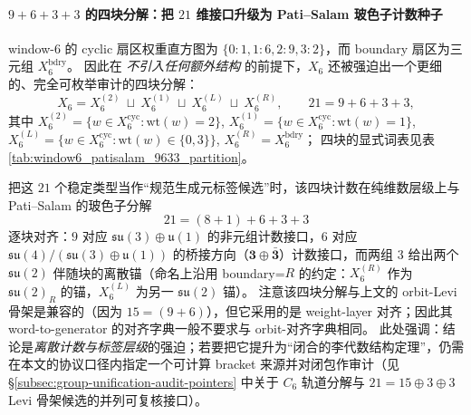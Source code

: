 \paragraph{\texorpdfstring{$9+6+3+3$}{9+6+3+3} 的四块分解：把 \texorpdfstring{$21$}{21} 维接口升级为 Pati--Salam 玻色子计数种子}
window-6 的 cyclic 扇区权重直方图为 \(\{0:1,1:6,2:9,3:2\}\)，而 boundary 扇区为三元组 \(X_6^{\mathrm{bdry}}\)。
因此在 \emph{不引入任何额外结构} 的前提下，\(X_6\) 还被强迫出一个更细的、完全可枚举审计的四块分解：
\[
X_6
=X^{(2)}_6\ \sqcup\ X^{(1)}_6\ \sqcup\ X^{(L)}_6\ \sqcup\ X^{(R)}_6,
\qquad
21=9+6+3+3,
\]
其中
\(
X^{(2)}_6=\{w\in X_6^{\mathrm{cyc}}:\mathrm{wt}(w)=2\}
\),
\(
X^{(1)}_6=\{w\in X_6^{\mathrm{cyc}}:\mathrm{wt}(w)=1\}
\),
\(
X^{(L)}_6=\{w\in X_6^{\mathrm{cyc}}:\mathrm{wt}(w)\in\{0,3\}\}
\),
\(
X^{(R)}_6=X_6^{\mathrm{bdry}}
\)；
四块的显式词表见表 \ref{tab:window6_patisalam_9633_partition}。

\par
把这 \(21\) 个稳定类型当作“规范生成元标签候选”时，该四块计数在纯维数层级上与 Pati--Salam 的玻色子分解
\[
21=(8+1)+6+3+3
\]
逐块对齐：\(9\) 对应 \(\mathfrak{su}(3)\oplus\mathfrak{u}(1)\) 的非元组计数接口，\(6\) 对应
\(\mathfrak{su}(4)/(\mathfrak{su}(3)\oplus\mathfrak{u}(1))\) 的桥接方向（\(\mathbf{3}\oplus\bar{\mathbf{3}}\)）计数接口，而两组 \(3\) 给出两个 \(\mathfrak{su}(2)\) 伴随块的离散锚（命名上沿用 boundary=\(R\) 的约定：\(X^{(R)}_6\) 作为 \(\mathfrak{su}(2)_R\) 的锚，\(X^{(L)}_6\) 为另一 \(\mathfrak{su}(2)\) 锚）。
注意该四块分解与上文的 orbit-Levi 骨架是兼容的（因为 \(15=(9+6)\)），但它采用的是 weight-layer 对齐；因此其 word-to-generator 的对齐字典一般不要求与 orbit-对齐字典相同。
此处强调：结论是\emph{离散计数与标签层级}的强迫；若要把它提升为“闭合的李代数结构定理”，仍需在本文的协议口径内指定一个可计算 bracket 来源并对闭包作审计（见 \S\ref{subsec:group-unification-audit-pointers} 中关于 \(C_6\) 轨道分解与 \(21=15\oplus 3\oplus 3\) Levi 骨架候选的并列可复核接口）。

